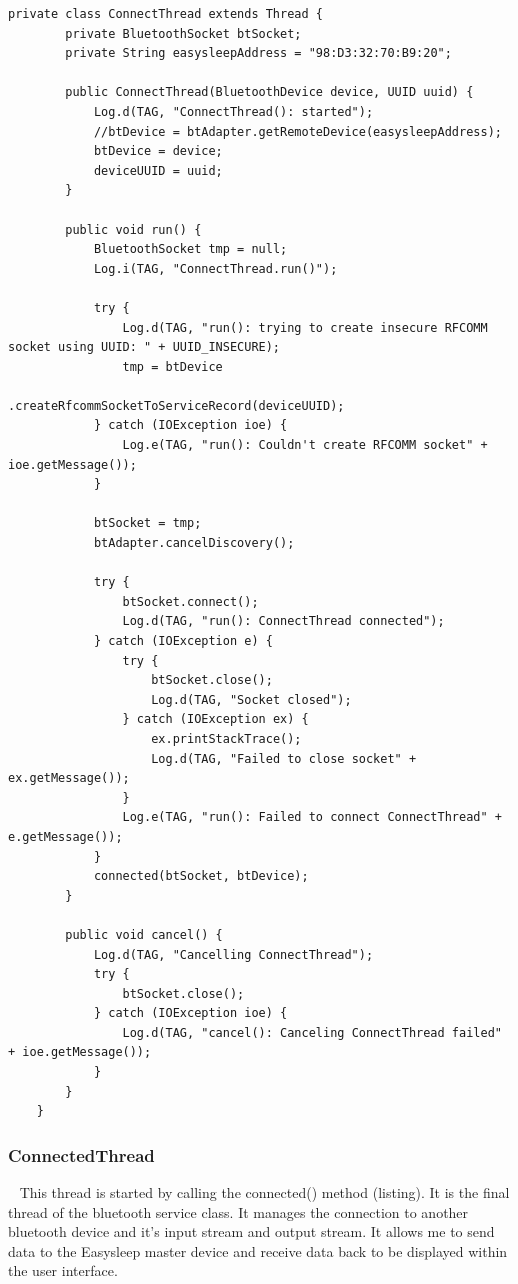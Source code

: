 \documentclass[12pt,a4paper]{article}
\begin{document}
    \begin{lstlisting}[label={lst:connectThread}, caption=ConnectThread class]
     private class ConnectThread extends Thread {
        private BluetoothSocket btSocket;
        private String easysleepAddress = "98:D3:32:70:B9:20";

        public ConnectThread(BluetoothDevice device, UUID uuid) {
            Log.d(TAG, "ConnectThread(): started");
            //btDevice = btAdapter.getRemoteDevice(easysleepAddress);
            btDevice = device;
            deviceUUID = uuid;
        }

        public void run() {
            BluetoothSocket tmp = null;
            Log.i(TAG, "ConnectThread.run()");

            try {
                Log.d(TAG, "run(): trying to create insecure RFCOMM socket using UUID: " + UUID_INSECURE);
                tmp = btDevice
                        .createRfcommSocketToServiceRecord(deviceUUID);
            } catch (IOException ioe) {
                Log.e(TAG, "run(): Couldn't create RFCOMM socket" + ioe.getMessage());
            }

            btSocket = tmp;
            btAdapter.cancelDiscovery();

            try {
                btSocket.connect();
                Log.d(TAG, "run(): ConnectThread connected");
            } catch (IOException e) {
                try {
                    btSocket.close();
                    Log.d(TAG, "Socket closed");
                } catch (IOException ex) {
                    ex.printStackTrace();
                    Log.d(TAG, "Failed to close socket" + ex.getMessage());
                }
                Log.e(TAG, "run(): Failed to connect ConnectThread" + e.getMessage());
            }
            connected(btSocket, btDevice);
        }

        public void cancel() {
            Log.d(TAG, "Cancelling ConnectThread");
            try {
                btSocket.close();
            } catch (IOException ioe) {
                Log.d(TAG, "cancel(): Canceling ConnectThread failed" + ioe.getMessage());
            }
        }
    }
    \end{lstlisting}

    \subsubsection*{ConnectedThread}~\cite{bib:connectedThread}
    This thread is started by calling the connected() method (listing). It is the final thread of the bluetooth service class. It manages the connection to another bluetooth device and it's input stream and output stream. It allows me to send data to the Easysleep master device and receive data back to be displayed within the user interface.
    
\end{document}
